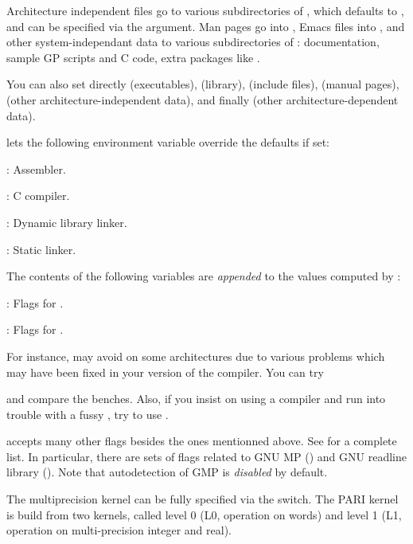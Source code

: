 Architecture independent files go to various subdirectories of
, which defaults to , and can be
specified via the  argument. Man pages go into
, Emacs files into
, and other system-independant data
to various subdirectories of : documentation,
sample GP scripts and C code, extra packages like .

\noindent You can also set directly  (executables),
 (library),  (include files), 
(manual pages),  (other architecture-independent data), and
finally  (other architecture-dependent data).

  lets the following environment
variable override the defaults if set:

: Assembler.

: C compiler.

: Dynamic library linker.

: Static linker.

\noindent The contents of the following variables are \emph{appended} to the
values computed by :

: Flags for .

: Flags for .


\noindent For instance,  may avoid  on some
architectures due to various problems which may have been fixed in your
version of the compiler. You can try


\noindent and compare the benches. Also, if you insist on using a 
compiler and run into trouble with a fussy , try to use
.

  accepts many other flags
besides the ones mentionned above. See  for a complete
list. In particular, there are sets of flags related to GNU MP
() and GNU readline library ().
Note that autodetection of GMP is \emph{disabled} by default.

 The multiprecision kernel can be fully
specified via the  switch. The PARI kernel is build
from two kernels, called level 0 (L0, operation on words) and level 1 (L1,
operation on multi-precision integer and real).


